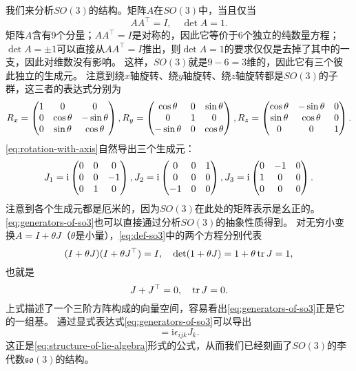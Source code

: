 \documentclass[hyperref, UTF8, a4paper]{ctexart}
\newcommand*{\ii}{\mathrm{i}}
\begin{document}
我们来分析$SO(3)$的结构。矩阵$A$在$SO(3)$中，当且仅当
\begin{equation}
    A A^\top = I, \quad \det A = 1.
    \label{eq:def-so3}
\end{equation}
矩阵$A$含有9个分量；$A A^\top = I$是对称的，因此它等价于6个独立的纯数量方程；
$\det A = \pm 1$可以直接从$A A^\top=I$推出，则$\det A = 1$的要求仅仅是去掉了其中的一支，因此对维数没有影响。
这样，$SO(3)$就是$9-6=3$维的，因此它有三个彼此独立的生成元。
注意到绕$x$轴旋转、绕$y$轴旋转、绕$z$轴旋转都是$SO(3)$的子群，这三者的表达式分别为
\begin{equation}
    R_x = \pmqty{1 & 0 & 0 \\ 0 & \cos \theta & -\sin \theta \\ 0 & \sin \theta & \cos \theta}, 
    R_y = \pmqty{\cos \theta & 0 & \sin \theta \\ 0 & 1 & 0 \\ - \sin \theta & 0 & \cos \theta}, 
    R_z = \pmqty{\cos \theta & - \sin \theta & 0 \\ \sin \theta & \cos \theta & 0 \\ 0 & 0 & 1}.
    \label{eq:rotation-with-axis}
\end{equation}
\eqref{eq:rotation-with-axis}自然导出三个生成元：
\begin{equation}
    J_1 = \ii \pmqty{0 & 0 & 0 \\ 0 & 0 & -1 \\ 0 & 1 & 0}, 
    J_2 = \ii \pmqty{0 & 0 & 1 \\ 0 & 0 & 0 \\ -1 & 0 & 0}, \\
    J_3 = \ii \pmqty{0 & -1 & 0 \\ 1 & 0 & 0 \\ 0 & 0 & 0}.
    \label{eq:generators-of-so3}
\end{equation}
注意到各个生成元都是厄米的，因为$SO(3)$在此处的矩阵表示是幺正的。
\eqref{eq:generators-of-so3}也可以直接通过分析$SO(3)$的抽象性质得到。
对无穷小变换$A = I + \theta J$（$\theta$是小量），\eqref{eq:def-so3}中的两个方程分别代表
\[
    (I+\theta J) (I + \theta J^\top) = I, \quad \det (1 + \theta J) = 1 + \theta \trace J = 1,
\]
也就是
\[
    J + J^\top = 0, \quad \trace J = 0.
\]
上式描述了一个三阶方阵构成的向量空间，容易看出\eqref{eq:generators-of-so3}正是它的一组基。
通过显式表达式\eqref{eq:generators-of-so3}可以导出
\begin{equation}
    [J_i, J_j] = \ii \epsilon_{ijk} J_k.
    \label{eq:lie-algebra-so3}
\end{equation}
这正是\eqref{eq:structure-of-lie-algebra}形式的公式，从而我们已经刻画了$SO(3)$的李代数$\mathfrak{so}(3)$的结构。
\end{document}
